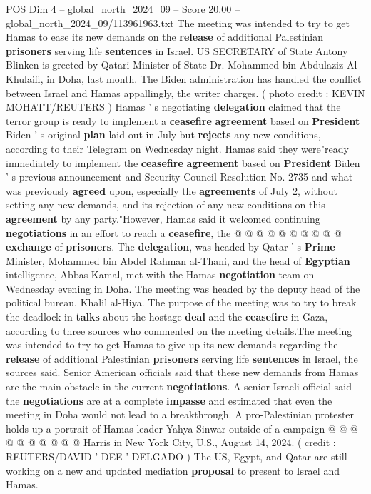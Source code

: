 \begin{textsample}{POS Dim 4 – global\_north\_2024\_09 – Score 20.00 – global\_north\_2024\_09/113961963.txt}  \label{ex:f4_pos_324}
The meeting was intended to try to get Hamas to ease its new demands on the \textbf{release} of additional Palestinian \textbf{prisoners} serving life \textbf{sentences} in Israel.
US SECRETARY of State Antony Blinken is greeted by Qatari Minister of State Dr.
Mohammed bin Abdulaziz Al-Khulaifi, in Doha, last month.
The Biden administration has handled the conflict between Israel and Hamas appallingly, the writer charges. ( photo credit : KEVIN MOHATT/REUTERS ) Hamas ' s negotiating \textbf{delegation} claimed that the terror group is ready to implement a \textbf{ceasefire} \textbf{agreement} based on \textbf{President} Biden ' s original \textbf{plan} laid out in July but \textbf{rejects} any new conditions, according to their Telegram on Wednesday night.
Hamas said they were"ready immediately to implement the \textbf{ceasefire} \textbf{agreement} based on \textbf{President} Biden ' s previous announcement and Security Council Resolution No. 2735 and what was previously \textbf{agreed} upon, especially the \textbf{agreements} of July 2, without setting any new demands, and its rejection of any new conditions on this \textbf{agreement} by any party."However, Hamas said it welcomed continuing \textbf{negotiations} in an effort to reach a \textbf{ceasefire}, the @ @ @ @ @ @ @ @ @ @ \textbf{exchange} of \textbf{prisoners}.
The \textbf{delegation}, was headed by Qatar ' s \textbf{Prime} Minister, Mohammed bin Abdel Rahman al-Thani, and the head of \textbf{Egyptian} intelligence, Abbas Kamal, met with the Hamas \textbf{negotiation} team on Wednesday evening in Doha.
The meeting was headed by the deputy head of the political bureau, Khalil al-Hiya.
The purpose of the meeting was to try to break the deadlock in \textbf{talks} about the hostage \textbf{deal} and the \textbf{ceasefire} in Gaza, according to three sources who commented on the meeting details.The meeting was intended to try to get Hamas to give up its new demands regarding the \textbf{release} of additional Palestinian \textbf{prisoners} serving life \textbf{sentences} in Israel, the sources said.
Senior American officials said that these new demands from Hamas are the main obstacle in the current \textbf{negotiations}.
A senior Israeli official said the \textbf{negotiations} are at a complete \textbf{impasse} and estimated that even the meeting in Doha would not lead to a breakthrough.
A pro-Palestinian protester holds up a portrait of Hamas leader Yahya Sinwar outside of a campaign @ @ @ @ @ @ @ @ @ @ Harris in New York City, U.S., August 14, 2024. ( credit : REUTERS/DAVID ' DEE ' DELGADO ) The US, Egypt, and Qatar are still working on a new and updated mediation \textbf{proposal} to present to Israel and Hamas.

\end{textsample}
